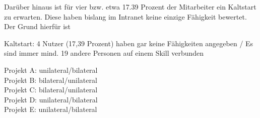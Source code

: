 Darüber hinaus ist für vier bzw. etwa 17.39 Prozent der Mitarbeiter ein Kaltstart zu erwarten. Diese haben bislang im Intranet keine einzige Fähigkeit bewertet. Der Grund hierfür ist


\newpage




Kaltstart: 4 Nutzer (17,39 Prozent) haben gar keine Fähigkeiten angegeben / Es sind immer mind. 19 andere Personen auf einem Skill verbunden

Projekt A: unilateral/bilateral\\
Projekt B: bilateral/unilateral\\
Projekt C: bilateral/unilateral\\
Projekt D: unilateral/bilateral\\
Projekt E: unilateral/bilateral


